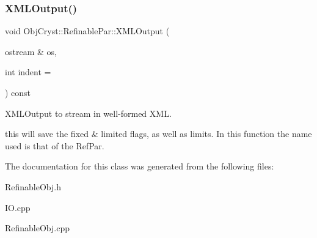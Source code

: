 \subsubsection{\texorpdfstring{XMLOutput()}{XMLOutput()}\hspace{0.1cm}{\footnotesize\ttfamily [2/2]}}
{\footnotesize\ttfamily void Obj\+Cryst\+::\+Refinable\+Par\+::\+X\+M\+L\+Output (\begin{DoxyParamCaption}\item[{ostream \&}]{os,  }\item[{int}]{indent = {} }\end{DoxyParamCaption}) const}



X\+M\+L\+Output to stream in well-\/formed X\+ML. 

this will save the fixed \& limited flags, as well as limits. In this function the name used is that of the Ref\+Par. 

The documentation for this class was generated from the following files\+:\begin{DoxyCompactItemize}
\item 
Refinable\+Obj.\+h\item 
I\+O.\+cpp\item 
Refinable\+Obj.\+cpp\end{DoxyCompactItemize}
